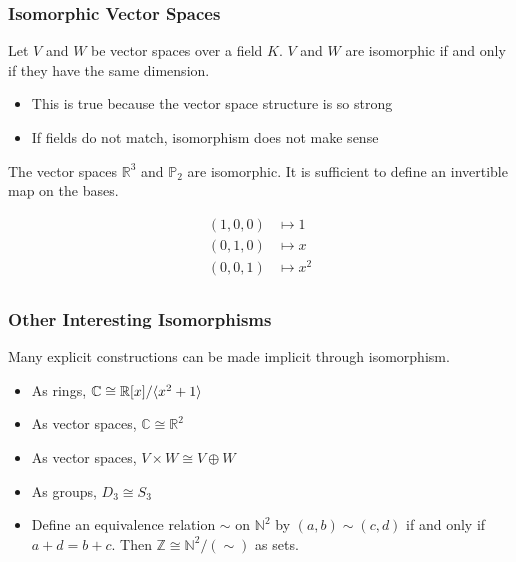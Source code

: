 \documentclass{beamer}
\DeclarePairedDelimiter{\inner}{\langle}{\rangle}
\begin{document}
\begin{frame}
  \frametitle{Isomorphic Vector Spaces}

  \begin{lemma}
    Let \(V\) and \(W\) be vector spaces over a field \(K\). \(V\) and \(W\)
    are isomorphic if and only if they have the same dimension.
  \end{lemma}

  \begin{itemize}
    \item This is true because the vector space structure is so strong
    \item If fields do not match, isomorphism does not make sense
  \end{itemize} \pause

  \begin{examples}
    The vector spaces \(\mathbb{R}^3\) and \(\mathbb{P}_2\) are isomorphic. It
    is sufficient to define an invertible map on the bases.

    \begin{align*}
      (1, 0, 0) & \mapsto 1 \\
      (0, 1, 0) & \mapsto x \\
      (0, 0, 1) & \mapsto x^2 \\
    \end{align*}
  \end{examples}
\end{frame}

\begin{frame}
  \frametitle{Other Interesting Isomorphisms}

  Many explicit constructions can be made implicit through isomorphism.

  \begin{examples}
    \begin{itemize}
      \item As rings, \(\mathbb{C} \cong \mathbb{R}[x]/\inner{x^2 + 1}\)
      \item As vector spaces, \(\mathbb{C} \cong \mathbb{R}^2\)
      \item As vector spaces, \(V \times W \cong V \oplus W\)
      \item As groups, \(D_3 \cong S_3\)
      \item Define an equivalence relation \(\sim\) on \(\mathbb{N}^2\) by
        \((a, b) \sim (c, d)\) if and only if \(a + d = b + c\). Then
        \(\mathbb{Z} \cong \mathbb{N}^2/(\sim)\) as sets.
    \end{itemize}
  \end{examples}
\end{frame}
\end{document}
